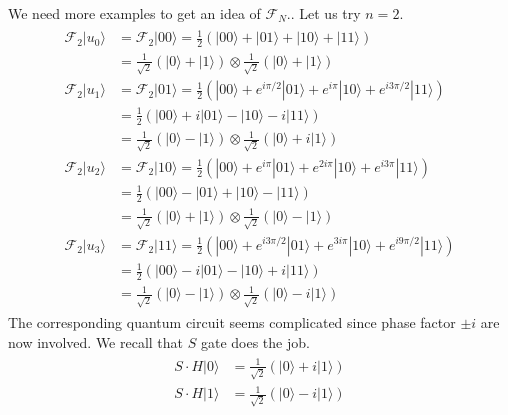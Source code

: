 \documentclass[letterpaper,10pt,english]{jupyterBook}
\begin{document}
\sphinxAtStartPar
{}

\sphinxAtStartPar
We need more examples to get an idea of \(\mathcal{F}_N\)..  Let us try \(n=2\).
\begin{equation}\label{equation:algorithms/qft:qft4}
\begin{split}
\begin{align}
\mathcal{F}_2 |u_0\rangle &=\mathcal{F}_2 |00\rangle = \frac{1}{2} \left(|00\rangle + |01\rangle  +|10\rangle + |11\rangle\right)\\ &= \frac{1}{\sqrt{2}} \left(|0\rangle + |1\rangle\right) \otimes
\frac{1}{\sqrt{2}} \left(|0\rangle + |1\rangle\right) \\
\mathcal{F}_2 |u_1\rangle &= \mathcal{F}_2 |01\rangle = \frac{1}{2} \left(|00\rangle + e^{i \pi/2}|01\rangle + e^{i \pi}|10\rangle + e^{i 3\pi/2}|11\rangle \right)\\
&= \frac{1}{2} \left(|00\rangle + i |01\rangle  - |10\rangle  -i |11\rangle \right)\\& = \frac{1}{\sqrt{2}} \left(|0\rangle -  |1\rangle\right) \otimes \frac{1}{\sqrt{2}} \left(|0\rangle + i |1\rangle\right) \\
\mathcal{F}_2 |u_2\rangle &= \mathcal{F}_2 |10\rangle = \frac{1}{2} \left(|00\rangle + e^{i \pi}|01\rangle + e^{2 i \pi}|10\rangle + e^{i 3 \pi}|11\rangle \right) \\
&= \frac{1}{2} \left(|00\rangle - |01\rangle +|10\rangle - |11\rangle \right) \\
&=  \frac{1}{\sqrt{2}} \left(|0\rangle + |1\rangle\right) \otimes \frac{1}{\sqrt{2}} \left(|0\rangle - |1\rangle\right)\\
\mathcal{F}_2 |u_3\rangle &= \mathcal{F}_2 |11\rangle = \frac{1}{2} \left(|00\rangle + e^{i 3\pi/2}|01\rangle + e^{3 i \pi}|10\rangle + e^{i 9 \pi/2} |11\rangle \right) \\
&= \frac{1}{2} \left(|00\rangle - i|01\rangle - |10\rangle + i |11\rangle \right) \\
&=  \frac{1}{\sqrt{2}} \left(|0\rangle - |1\rangle\right) \otimes \frac{1}{\sqrt{2}} \left(|0\rangle -i |1\rangle\right)
\end{align}
\end{split}
\end{equation}
\sphinxAtStartPar
The corresponding quantum circuit seems complicated since phase factor \(\pm i\) are now involved.  We recall that \(S\) gate does the job.
\begin{equation}\label{equation:algorithms/qft:s-h-gates}
\begin{split}
\begin{align}
S \cdot H |0\rangle &= \frac{1}{\sqrt{2}}\left(|0\rangle + i |1\rangle\right) \\
S \cdot H |1\rangle &= \frac{1}{\sqrt{2}}\left(|0\rangle - i |1\rangle\right)
\end{align}
\end{split}
\end{equation}
\end{document}
